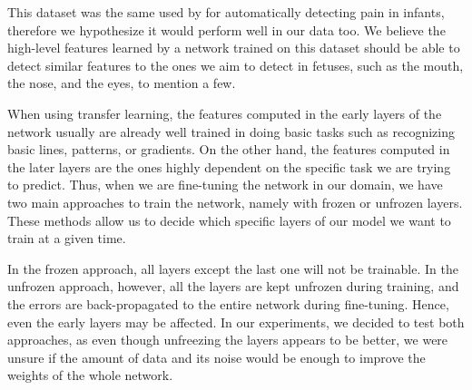 This dataset was the same used by \cite{abs-1807-01631} for automatically detecting pain in infants, therefore we hypothesize it would perform well in our data too. We believe the high-level features learned by a network trained on this dataset should be able to detect similar features to the ones we aim to detect in fetuses, such as the mouth, the nose, and the eyes, to mention a few.

When using transfer learning, the features computed in the early layers of the network usually are already well trained in doing basic tasks such as recognizing basic lines, patterns, or gradients. On the other hand, the features computed in the later layers are the ones highly dependent on the specific task we are trying to predict. Thus, when we are fine-tuning the network in our domain, we have two main approaches to train the network, namely with frozen or unfrozen layers. These methods allow us to decide which specific layers of our model we want to train at a given time. 

In the frozen approach, all layers except the last one will not be trainable. In the unfrozen approach, however, all the layers are kept unfrozen during training, and the errors are back-propagated to the entire network during fine-tuning. Hence, even the early layers may be affected. In our experiments, we decided to test both approaches, as even though unfreezing the layers appears to be better, we were unsure if the amount of data and its noise would be enough to improve the weights of the whole network.
